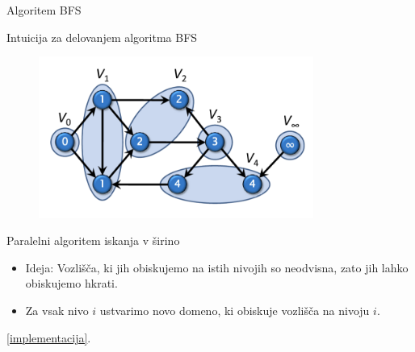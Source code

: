 \documentclass{beamer}
\begin{document}
\begin{frame}{Algoritem BFS}
    \begin{algorithm}[H]
      \SetAlgoLined
      \DontPrintSemicolon
      \label{alg:non_parallel_bfs}
    \end{algorithm}
  \end{frame}
  
\begin{frame}{Intuicija za delovanjem algoritma BFS}
    \begin{figure}
        \centering
        \includegraphics[width=9cm]{slike/parallel_bfs/pbfs_graph_by_levels.png}
        \label{fig:pbfs_graph_example}
    \end{figure}
\end{frame}

\begin{frame}{Paralelni algoritem iskanja v širino}
    \begin{itemize}
        \item Ideja: Vozlišča, ki jih obiskujemo na istih nivojih so neodvisna, zato jih lahko obiskujemo hkrati.
        \item Za vsak nivo $i$ ustvarimo novo domeno, ki obiskuje vozlišča na nivoju $i$.
    \end{itemize}
    \href{https://github.com/tjazerzen/parallelisation-of-graph-algorithms-in-functional-programming-languages/blob/parallel_BFS/playground/graph/bfs.ml}{[implementacija]}.
\end{frame}
\end{document}
